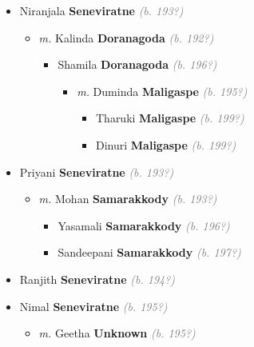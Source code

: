 \documentclass[10pt, openany]{book}
\begin{document}
\begin{itemize}
{\begin{itemize}
{\begin{itemize}
{\begin{itemize}
\item{Niranjala \textbf{Seneviratne} \textcolor{gray}{\textit{(b. 193?)}}
\begin{itemize}
\item{\textit{m.} Kalinda \textbf{Doranagoda} \textcolor{gray}{\textit{(b. 192?)}}   \label{couple:00002162:00002163} \begin{itemize}
\item{Shamila \textbf{Doranagoda} \textcolor{gray}{\textit{(b. 196?)}}
\begin{itemize}
\item{\textit{m.} Duminda \textbf{Maligaspe} \textcolor{gray}{\textit{(b. 195?)}}   \label{couple:00002164:00002165} \begin{itemize}
\item{Tharuki \textbf{Maligaspe} \textcolor{gray}{\textit{(b. 199?)}}
 }
\item{Dinuri \textbf{Maligaspe} \textcolor{gray}{\textit{(b. 199?)}}
 }
\end{itemize}}
\end{itemize}
 }
\end{itemize}}
\end{itemize}
 }
\item{Priyani \textbf{Seneviratne} \textcolor{gray}{\textit{(b. 193?)}}
\begin{itemize}
\item{\textit{m.} Mohan \textbf{Samarakkody} \textcolor{gray}{\textit{(b. 193?)}}   \label{couple:00002168:00002169} \begin{itemize}
\item{Yasamali \textbf{Samarakkody} \textcolor{gray}{\textit{(b. 196?)}}
 }
\item{Sandeepani \textbf{Samarakkody} \textcolor{gray}{\textit{(b. 197?)}}
 }
\end{itemize}}
\end{itemize}
 }
\item{Ranjith \textbf{Seneviratne} \textcolor{gray}{\textit{(b. 194?)}}
 }
\item{Nimal \textbf{Seneviratne} \textcolor{gray}{\textit{(b. 195?)}}
\begin{itemize}
\item{\textit{m.} Geetha \textbf{Unknown} \textcolor{gray}{\textit{(b. 195?)}}   \label{couple:00002158:00002159} \begin{itemize}

\end{itemize}}
\end{itemize}}
\end{itemize}}
\end{itemize}}
\end{itemize}}
\end{itemize}
\end{document}
